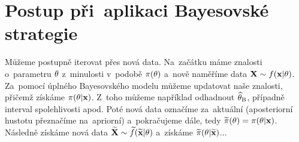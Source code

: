 \section{Postup při~aplikaci Bayesovské strategie} 
	Můžeme postupně iterovat přes nová data. Na~začátku máme znalosti o~parametru $\theta$ z~minulosti v~podobě $\pi(\theta)$ a~nově naměříme data $\textbf{X}\sim f(\textbf{x}|\theta)$. Za~pomocí úplného Bayesovského modelu můžeme updatovat naše znalosti, přičemž získáme $\pi(\theta|\textbf{x})$. Z~toho můžeme například odhadnout $\widehat{\theta}_\mathrm{B}$, případně interval spolehlivosti apod. Poté nová data označíme za~aktuální (aposteriorní hustotu přeznačíme na~apriorní) a~pokračujeme dále, tedy $\widetilde{\pi}(\theta)=\pi(\theta|\textbf{x})$. Následně získáme nová data $\widetilde{\textbf{X}}\sim\widetilde{f}(\widetilde{\textbf{x}}|\theta)$ a~získáme $\widetilde{\pi}(\theta|\widetilde{\textbf{x}})$... 

